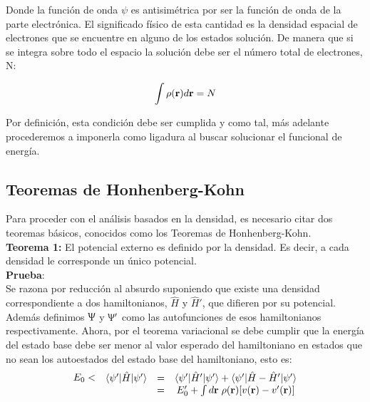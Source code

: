 \documentclass [11pt]{article}
\begin{document}
Donde la función de onda $\psi$ es antisimétrica por ser la función de onda de la parte electrónica. El significado físico de esta cantidad es la densidad espacial de electrones que se encuentre en alguno de los estados solución. De manera que si se integra sobre todo el espacio la solución debe ser el número total de electrones, N:

\begin{equation}\label{norma}
	\int \rho({\bf r})d{\bf r}=N
\end{equation}

Por definición, esta condición debe ser cumplida y como tal, más adelante procederemos a imponerla como ligadura al buscar solucionar el funcional de energía.


\subsection{Teoremas de Honhenberg-Kohn}
Para proceder con el análisis basados en la densidad, es necesario citar dos teoremas básicos, conocidos como los Teoremas de Honhenberg-Kohn.\\

{\bf Teorema 1:} El potencial externo es definido por la densidad. Es decir, a cada densidad le corresponde un único potencial.\\

{\bf Prueba}:\\
Se razona por reducción al absurdo suponiendo que existe una densidad correspondiente a dos hamiltonianos, $\hat H$ y $\hat H'$, que difieren por su potencial. Además definimos $\Uppsi$ y $\Uppsi'$ como las autofunciones de esos hamiltonianos respectivamente. Ahora, por el teorema variacional se debe cumplir que la energía del estado base debe ser menor al valor esperado del hamiltoniano en estados que no sean los autoestados del estado base del hamiltoniano, esto es:
\begin{equation}
	\begin{array}{c}
	     E_0 < \\
	      \\
	\end{array} 
	\begin{array}{ccc}
	    \langle\psi'|\hat{H}|\psi'\rangle & = & \langle\psi'|\hat{H}'|\psi'\rangle+\langle\psi'|\hat{H}-\hat{H}'|\psi'\rangle \\
	                                      & = & E_0'+\int d{\bf r}\hspace{0.1 cm}\rho({\bf r})[v({\bf r})-v'({\bf r})]
	\end{array}
\end{equation}
\end{document}
